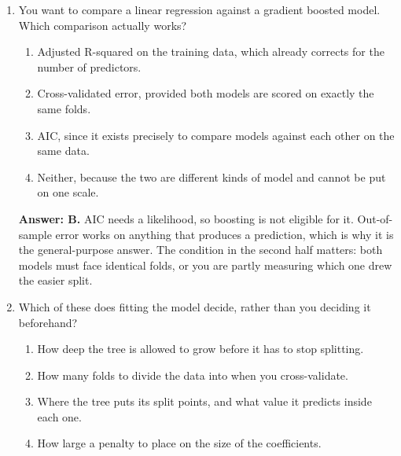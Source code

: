 \documentclass[11pt]{article}
\begin{document}
\begin{enumerate}[itemsep=14pt]
\vspace{2pt}
\textbf{Answer: C.} No distribution means no likelihood, and a p-value would have nothing to be computed from. The quantity does not exist rather than being hidden somewhere. Resampling will tell you how much an importance score wobbles, which is worth knowing, but that is a stability check and not a test of any hypothesis.
\vspace{4pt}

\item You want to compare a linear regression against a gradient boosted model. Which comparison actually works?

\begin{enumerate}[label=\Alph*., itemsep=1pt, topsep=3pt]
  \item Adjusted R-squared on the training data, which already corrects for the number of predictors.
  \item Cross-validated error, provided both models are scored on exactly the same folds.
  \item AIC, since it exists precisely to compare models against each other on the same data.
  \item Neither, because the two are different kinds of model and cannot be put on one scale.
\end{enumerate}

\vspace{2pt}
\textbf{Answer: B.} AIC needs a likelihood, so boosting is not eligible for it. Out-of-sample error works on anything that produces a prediction, which is why it is the general-purpose answer. The condition in the second half matters: both models must face identical folds, or you are partly measuring which one drew the easier split.
\vspace{4pt}

\item Which of these does fitting the model decide, rather than you deciding it beforehand?

\begin{enumerate}[label=\Alph*., itemsep=1pt, topsep=3pt]
  \item How deep the tree is allowed to grow before it has to stop splitting.
  \item How many folds to divide the data into when you cross-validate.
  \item Where the tree puts its split points, and what value it predicts inside each one.
  \item How large a penalty to place on the size of the coefficients.
\end{enumerate}


\end{enumerate}
\end{document}
